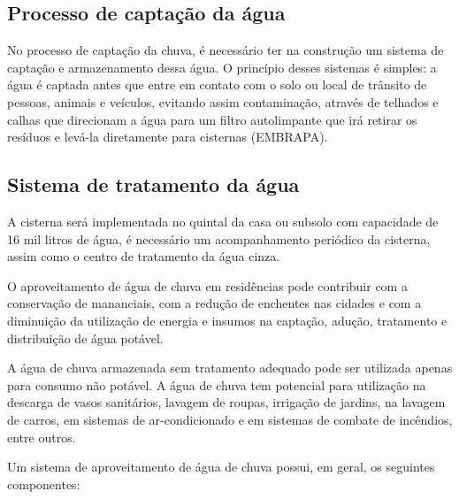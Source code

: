 \subsection{Processo de captação da água}

	No processo de captação da chuva, é necessário ter na construção um sistema de captação e armazenamento dessa água. O princípio desses sistemas é simples: a água é captada antes que entre em contato com o solo ou local de trânsito de pessoas, animais e veículos, evitando assim contaminação, através de telhados e calhas que direcionam a água para um filtro autolimpante que irá retirar os resíduos e levá-la diretamente para cisternas (EMBRAPA).

\subsection{Sistema de tratamento da água}

	A cisterna será implementada no quintal da casa ou subsolo com capacidade de 16 mil litros de água, é necessário um acompanhamento periódico da cisterna, assim como o centro de tratamento da água cinza.
	
	O aproveitamento de água de chuva em residências pode contribuir com a conservação de mananciais, com a redução de enchentes nas cidades e com a diminuição da utilização de energia e insumos na captação, adução, tratamento e distribuição de água potável.
	
	A água de chuva armazenada sem tratamento adequado pode ser utilizada apenas para consumo não potável. A água de chuva tem potencial para utilização na descarga de vasos sanitários, lavagem de roupas, irrigação de jardins, na lavagem de carros, em sistemas de ar-condicionado e em sistemas de combate de incêndios, entre outros.
	
	Um sistema de aproveitamento de água de chuva possui, em geral, os seguintes componentes:

